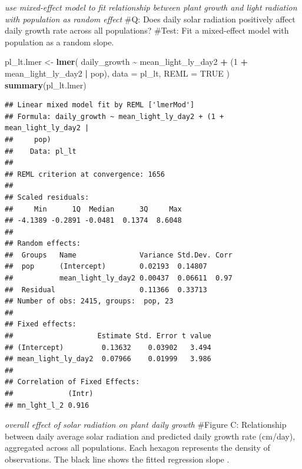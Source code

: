 \documentclass[
]{article}
\newenvironment{Shaded}{\begin{snugshade}}{\end{snugshade}}
\newcommand{\AttributeTok}[1]{\textcolor[rgb]{0.13,0.29,0.53}{#1}}
\newcommand{\ConstantTok}[1]{\textcolor[rgb]{0.56,0.35,0.01}{#1}}
\newcommand{\DecValTok}[1]{\textcolor[rgb]{0.00,0.00,0.81}{#1}}
\newcommand{\FunctionTok}[1]{\textcolor[rgb]{0.13,0.29,0.53}{\textbf{#1}}}
\newcommand{\NormalTok}[1]{#1}
\newcommand{\OtherTok}[1]{\textcolor[rgb]{0.56,0.35,0.01}{#1}}
\newcommand{\SpecialCharTok}[1]{\textcolor[rgb]{0.81,0.36,0.00}{\textbf{#1}}}
\begin{document}
\emph{use mixed-effect model to fit relationship between plant growth
and light radiation with population as random effect} \#Q: Does daily
solar radiation positively affect daily growth rate across all
populations? \#Test: Fit a mixed-effect model with population as a
random slope.

\begin{Shaded}
\begin{Highlighting}[]
\NormalTok{pl\_lt.lmer }\OtherTok{\textless{}{-}} \FunctionTok{lmer}\NormalTok{(}
\NormalTok{  daily\_growth }\SpecialCharTok{\textasciitilde{}}\NormalTok{ mean\_light\_ly\_day2 }\SpecialCharTok{+}                     
\NormalTok{    (}\DecValTok{1} \SpecialCharTok{+}\NormalTok{ mean\_light\_ly\_day2 }\SpecialCharTok{|}\NormalTok{ pop),                                    }
  \AttributeTok{data =}\NormalTok{ pl\_lt, }\AttributeTok{REML =} \ConstantTok{TRUE}
\NormalTok{)}
\FunctionTok{summary}\NormalTok{(pl\_lt.lmer)}
\end{Highlighting}
\end{Shaded}

\begin{verbatim}
## Linear mixed model fit by REML ['lmerMod']
## Formula: daily_growth ~ mean_light_ly_day2 + (1 + mean_light_ly_day2 |  
##     pop)
##    Data: pl_lt
## 
## REML criterion at convergence: 1656
## 
## Scaled residuals: 
##     Min      1Q  Median      3Q     Max 
## -4.1389 -0.2891 -0.0481  0.1374  8.6048 
## 
## Random effects:
##  Groups   Name               Variance Std.Dev. Corr
##  pop      (Intercept)        0.02193  0.14807      
##           mean_light_ly_day2 0.00437  0.06611  0.97
##  Residual                    0.11366  0.33713      
## Number of obs: 2415, groups:  pop, 23
## 
## Fixed effects:
##                    Estimate Std. Error t value
## (Intercept)         0.13632    0.03902   3.494
## mean_light_ly_day2  0.07966    0.01999   3.986
## 
## Correlation of Fixed Effects:
##             (Intr)
## mn_lght_l_2 0.916
\end{verbatim}

\emph{overall effect of solar radiation on plant daily growth} \#Figure
C: Relationship between daily average solar radiation and predicted
daily growth rate (cm/day), aggregated across all populations. Each
hexagon represents the density of observations. The black line shows the
fitted regression slope .
\end{document}
